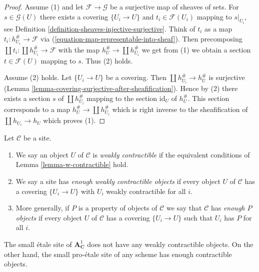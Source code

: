 \begin{proof}
Assume (1) and let $\mathcal{F} \to \mathcal{G}$ be a surjective map of
sheaves of sets. For $s \in \mathcal{G}(U)$ there exists a covering
$\{U_i \to U\}$ and $t_i \in \mathcal{F}(U_i)$ mapping to
$s|_{U_i}$, see Definition \ref{definition-sheaves-injective-surjective}.
Think of $t_i$ as a map $t_i : h_{U_i}^\# \to \mathcal{F}$ via
(\ref{equation-map-representable-into-sheaf}).
Then precomposing $\coprod t_i : \coprod h_{U_i}^\# \to \mathcal{F}$
with the map $h_U^\# \to \coprod h_{U_i}^\#$ we get from (1)
we obtain a section $t \in \mathcal{F}(U)$ mapping to $s$.
Thus (2) holds.

\medskip\noindent
Assume (2) holds. Let $\{U_i \to U\}$ be a covering.
Then $\coprod h_{U_i}^\# \to h_U^\#$ is surjective
(Lemma \ref{lemma-covering-surjective-after-sheafification}).
Hence by (2) there exists a section $s$ of $\coprod h_{U_i}^\#$ mapping
to the section $\text{id}_U$ of $h_U^\#$. This section corresponds to a map
$h_U^\# \to \coprod h_{U_i}^\#$ which is right inverse to the sheafification
of $\coprod h_{U_i} \to h_U$ which proves (1).
\end{proof}

\begin{definition}
\label{definition-w-contractible}
Let $\mathcal{C}$ be a site.
\begin{enumerate}
\item We say an object $U$ of $\mathcal{C}$ is {\it weakly contractible}
if the equivalent conditions of Lemma \ref{lemma-w-contractible} hold.
\item We say a site has {\it enough weakly contractible objects}
if every object $U$ of $\mathcal{C}$ has a covering $\{U_i \to U\}$
with $U_i$ weakly contractible for all $i$.
\item More generally, if $P$ is a property of objects of $\mathcal{C}$
we say that $\mathcal{C}$ has {\it enough $P$ objects} if every object $U$ of
$\mathcal{C}$ has a covering $\{U_i \to U\}$ such that $U_i$ has $P$
for all $i$.
\end{enumerate}
\end{definition}

\noindent
The small \'etale site of $\mathbf{A}^1_\mathbf{C}$ does not have
any weakly contractible objects. On the other hand, the small
pro-\'etale site of any scheme has enough contractible objects.








